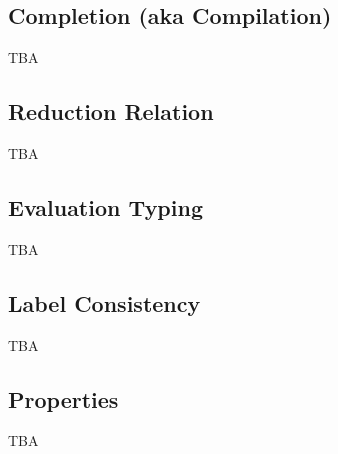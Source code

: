 \documentclass[nonacm,10pt]{acmart}
\begin{document}
\begin{mathpar}






\end{mathpar}


\subsection{Completion (aka Compilation)}

TBA


\subsection{Reduction Relation}

TBA

 
\subsection{Evaluation Typing}

TBA


\subsection{Label Consistency}

TBA


\subsection{Properties}

TBA
\end{document}
